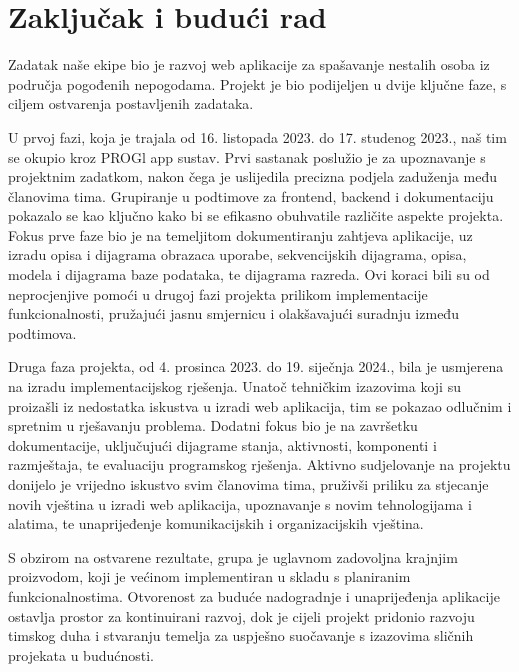 \chapter{Zaključak i budući rad}
		
		Zadatak naše ekipe bio je razvoj web aplikacije za spašavanje nestalih osoba iz područja pogođenih nepogodama. Projekt je bio podijeljen u dvije ključne faze, s ciljem ostvarenja postavljenih zadataka.
		
		U prvoj fazi, koja je trajala od 16. listopada 2023. do 17. studenog 2023., naš tim se okupio kroz PROGl app sustav. Prvi sastanak poslužio je za upoznavanje s projektnim zadatkom, nakon čega je uslijedila precizna podjela zaduženja među članovima tima. Grupiranje u podtimove za frontend, backend i dokumentaciju pokazalo se kao ključno kako bi se efikasno obuhvatile različite aspekte projekta. Fokus prve faze bio je na temeljitom dokumentiranju zahtjeva aplikacije, uz izradu opisa i dijagrama obrazaca uporabe, sekvencijskih dijagrama, opisa, modela i dijagrama baze podataka, te dijagrama razreda. Ovi koraci bili su od neprocjenjive pomoći u drugoj fazi projekta prilikom implementacije funkcionalnosti, pružajući jasnu smjernicu i olakšavajući suradnju između podtimova.
		
		Druga faza projekta, od 4. prosinca 2023. do 19. siječnja 2024., bila je usmjerena na izradu implementacijskog rješenja. Unatoč tehničkim izazovima koji su proizašli iz nedostatka iskustva u izradi web aplikacija, tim se pokazao odlučnim i spretnim u rješavanju problema. Dodatni fokus bio je na završetku dokumentacije, uključujući dijagrame stanja, aktivnosti, komponenti i razmještaja, te evaluaciju programskog rješenja. Aktivno sudjelovanje na projektu donijelo je vrijedno iskustvo svim članovima tima, pruživši priliku za stjecanje novih vještina u izradi web aplikacija, upoznavanje s novim tehnologijama i alatima, te unaprijeđenje komunikacijskih i organizacijskih vještina.
		
		S obzirom na ostvarene rezultate, grupa je uglavnom zadovoljna krajnjim proizvodom, koji je većinom implementiran u skladu s planiranim funkcionalnostima. Otvorenost za buduće nadogradnje i unaprijeđenja aplikacije ostavlja prostor za kontinuirani razvoj, dok je cijeli projekt pridonio razvoju timskog duha i stvaranju temelja za uspješno suočavanje s izazovima sličnih projekata u budućnosti.
		
		\eject 